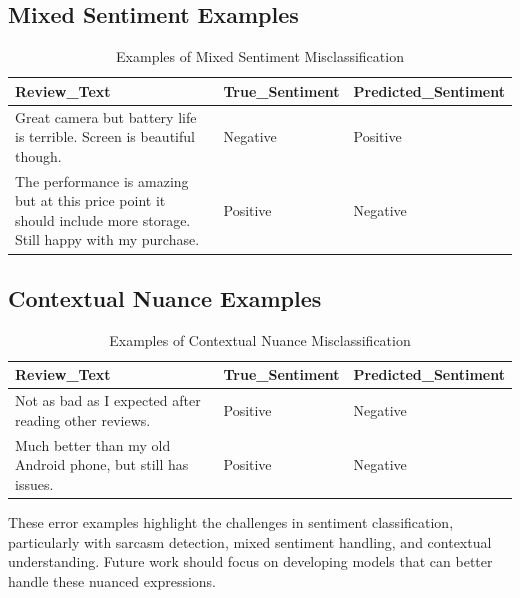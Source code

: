 \documentclass[
]{article}
\begin{document}
\subsection{Mixed Sentiment Examples}\label{mixed-sentiment-examples}

\begin{longtable}[t]{>{\raggedright\arraybackslash}p{10cm}ll}

\caption{\label{tbl-mixed-sentiment}Examples of Mixed Sentiment
Misclassification}

\tabularnewline

\toprule
\textbf{Review\_Text} & \textbf{True\_Sentiment} & \textbf{Predicted\_Sentiment}\\
\midrule
Great camera but battery life is terrible. Screen is beautiful though. & Negative & Positive\\
The performance is amazing but at this price point it should include more storage. Still happy with my purchase. & Positive & Negative\\
\bottomrule

\end{longtable}

\subsection{Contextual Nuance
Examples}\label{contextual-nuance-examples}

\begin{longtable}[t]{>{\raggedright\arraybackslash}p{10cm}ll}

\caption{\label{tbl-contextual-nuance}Examples of Contextual Nuance
Misclassification}

\tabularnewline

\toprule
\textbf{Review\_Text} & \textbf{True\_Sentiment} & \textbf{Predicted\_Sentiment}\\
\midrule
Not as bad as I expected after reading other reviews. & Positive & Negative\\
Much better than my old Android phone, but still has issues. & Positive & Negative\\
\bottomrule

\end{longtable}

These error examples highlight the challenges in sentiment
classification, particularly with sarcasm detection, mixed sentiment
handling, and contextual understanding. Future work should focus on
developing models that can better handle these nuanced expressions.
\end{document}
